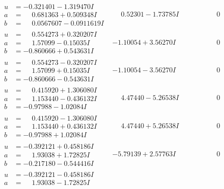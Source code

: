 \documentclass[1p]{elsarticle_modified}
\theoremstyle{definition}
\begin{document}
$$\begin{array}{c|c|c}
 \hline 
\begin{aligned}
u &= -0.321401 - 1.319470 I \\
a &= \phantom{-}0.681363 + 0.509348 I \\
b &= \phantom{-}0.0567607 - 0.0911619 I\end{aligned}
 & \phantom{-}0.52301 - 1.73785 I & \phantom{-0.000000 } 0 \\ \hline\begin{aligned}
u &= \phantom{-}0.554273 + 0.320207 I \\
a &= \phantom{-}1.57099 - 0.15035 I \\
b &= -0.860666 + 0.543631 I\end{aligned}
 & -1.10054 + 3.56270 I & \phantom{-0.000000 } 0 \\ \hline\begin{aligned}
u &= \phantom{-}0.554273 - 0.320207 I \\
a &= \phantom{-}1.57099 + 0.15035 I \\
b &= -0.860666 - 0.543631 I\end{aligned}
 & -1.10054 - 3.56270 I & \phantom{-0.000000 } 0 \\ \hline\begin{aligned}
u &= \phantom{-}0.415920 + 1.306080 I \\
a &= \phantom{-}1.153440 - 0.436132 I \\
b &= -0.97988 - 1.02084 I\end{aligned}
 & \phantom{-}4.47440 - 5.26538 I & \phantom{-0.000000 } 0 \\ \hline\begin{aligned}
u &= \phantom{-}0.415920 - 1.306080 I \\
a &= \phantom{-}1.153440 + 0.436132 I \\
b &= -0.97988 + 1.02084 I\end{aligned}
 & \phantom{-}4.47440 + 5.26538 I & \phantom{-0.000000 } 0 \\ \hline\begin{aligned}
u &= -0.392121 + 0.458186 I \\
a &= \phantom{-}1.93038 + 1.72825 I \\
b &= -0.217180 - 0.544416 I\end{aligned}
 & -5.79139 + 2.57763 I & \phantom{-0.000000 } 0 \\ \hline\begin{aligned}
u &= -0.392121 - 0.458186 I \\
a &= \phantom{-}1.93038 - 1.72825 I \\

\end{aligned}
\end{array}$$
\end{document}
